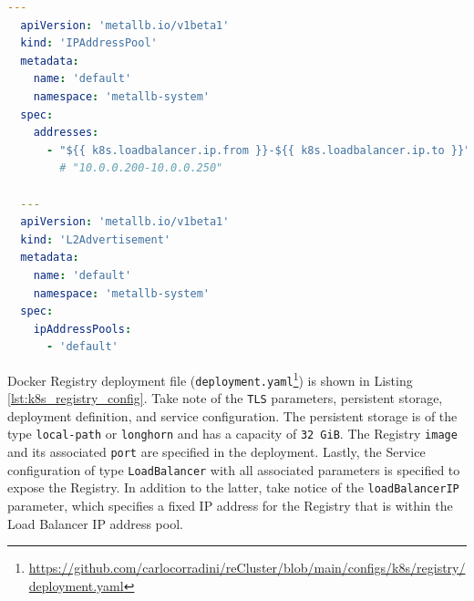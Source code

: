 \begin{lstlisting}[language=yaml, alsoletter={.}, morekeywords={[2]{apiVersion, kind, metadata, name, namespace, spec, addresses, ipAddressPools}}, xleftmargin=\parindent, label={lst:k8s_metallb_config}, caption=MetalLB configuration file]
  ---
  apiVersion: 'metallb.io/v1beta1'
  kind: 'IPAddressPool'
  metadata:
    name: 'default'
    namespace: 'metallb-system'
  spec:
    addresses:
      - "${{ k8s.loadbalancer.ip.from }}-${{ k8s.loadbalancer.ip.to }}"
        # "10.0.0.200-10.0.0.250"

  ---
  apiVersion: 'metallb.io/v1beta1'
  kind: 'L2Advertisement'
  metadata:
    name: 'default'
    namespace: 'metallb-system'
  spec:
    ipAddressPools:
      - 'default'
\end{lstlisting}

Docker Registry deployment file (\texttt{deployment.yaml}\footnote{\url{https://github.com/carlocorradini/reCluster/blob/main/configs/k8s/registry/deployment.yaml}})
is shown in Listing \ref{lst:k8s_registry_config}. Take note of the \texttt{TLS}
parameters, persistent storage, deployment definition, and service configuration.
The persistent storage is of the type \texttt{local-path} or \texttt{longhorn} and
has a capacity of \texttt{32 GiB}. The Registry \texttt{image} and its
associated \texttt{port} are specified in the deployment. Lastly, the Service configuration
of type \texttt{LoadBalancer} with all associated parameters is specified to
expose the Registry. In addition to the latter, take notice of the \texttt{loadBalancerIP}
parameter, which specifies a fixed IP address for the Registry that is within
the Load Balancer IP address pool.

